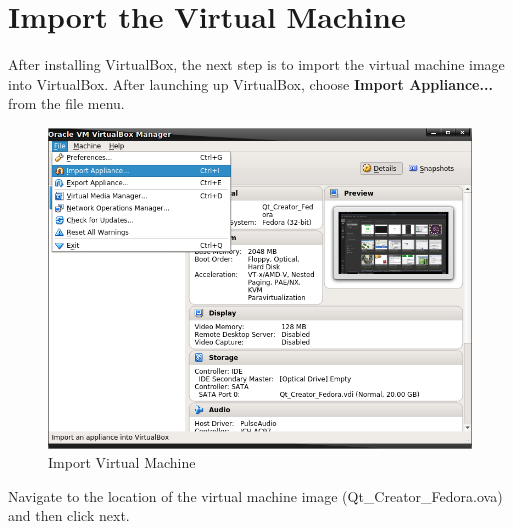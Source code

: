 \documentclass{article}
\begin{document}
\section{Import the Virtual Machine}

After installing VirtualBox, the next step is to import the virtual machine image into VirtualBox. After launching up VirtualBox, choose \textbf{Import Appliance...} from the file menu.

	\begin{figure}[H]
		\centering
		\includegraphics[scale=0.35]{pics/VirtualBox_Import_Appliance.png}
		\caption{Import Virtual Machine}
		\label{Import_Virtual_Machine}
	\end{figure}


Navigate to the location of the virtual machine image (Qt\_Creator\_Fedora.ova) and then click next. 
\end{document}
